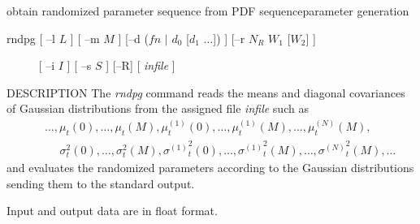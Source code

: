 %
{obtain randomized parameter sequence from PDF sequence}{parameter generation}

\def\bmath#1{\mbox{\boldmath{$#1$}}}
\def\bc{\bmath{c}}
\def\bo{\bmath{o}}
\def\bC{\bmath{C}}
\def\bO{\bmath{O}}
\def\bU{\bmath{U}}
\def\bmu{\bmath{\mu}}

\begin{synopsis}
	\item [rndpg] [ --l $L$ ] [ --m $M$ ] 
		[--d ($fn$ $|$ $d_0$ [$d_1$ $\ldots$]) ]
		[--r $N_R$ $W_1$ [$W_2$] ]
	\item [\ ~~~~] [ --i $I$ ] [ --s $S$ ] [--R] [ {\em infile} ] 
\end{synopsis}

\begin{qsection}{DESCRIPTION}
        The {\em rndpg} command reads the means and diagonal covariances
        of Gaussian distributions from the assigned file {\em infile}
        such as
 \begin{eqnarray}
	&& \ldots, \mu_t(0), \ldots, \mu_t(M),
		\mu^{(1)}_t(0), \ldots, \mu^{(1)}_t(M),
		\ldots, \mu^{(N)}_t(M),
		\nonumber\\
	&& ~~~~~~\sigma^2_t(0), \ldots, \sigma^2_t(M),
		{\sigma^{(1)}}^2_t(0), \ldots, {\sigma^{(1)}}^2_t(M),
		\ldots, {\sigma^{(N)}}^2_t(M),
		\ldots \nonumber
 \end{eqnarray}
        and evaluates the randomized parameters according to the 
	Gaussian distributions 
        sending them to the standard output.

	Input and output data are in float format.


\end{qsection}
